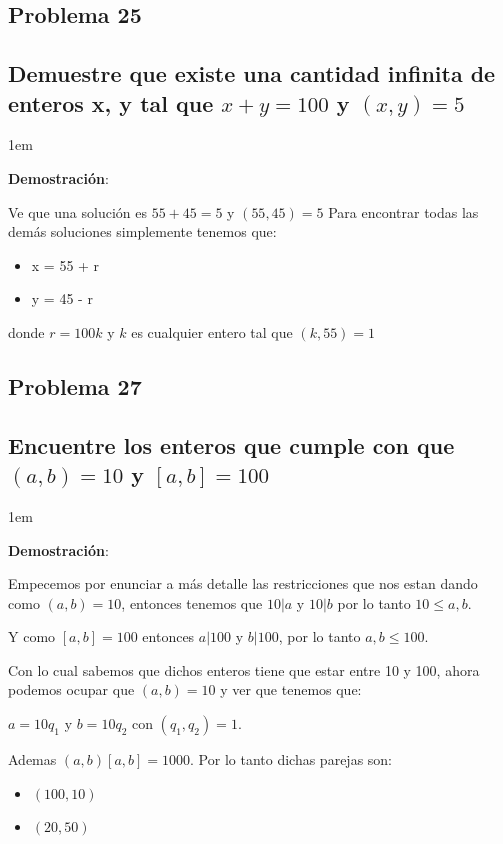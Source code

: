 \documentclass[12pt, fleqn]{article}                             %
\newenvironment{SmallIndentation}[1][0.75em]                    %
    {\begin{adjustwidth}{#1}{}\begin{footnotesize}}                 %
    {\end{footnotesize}\end{adjustwidth}}                           %
\begin{document}
    \subsection{Problema 25}
    \subsection*{Demuestre que existe una cantidad infinita de enteros
        x, y tal que $x+y=100$ y $(x,y)=5$}


        \begin{SmallIndentation}[1em]
            \textbf{Demostración}:

            Ve que una solución es $55 + 45 = 5$ y $(55, 45)=5$
            Para encontrar todas las demás soluciones simplemente 
            tenemos que:
            \begin{itemize}
                \item x = 55 + r
                \item y = 45 - r
            \end{itemize}

            donde $r = 100k$ y $k$ es cualquier entero tal que $(k, 55) = 1$
        \end{SmallIndentation}

    \clearpage

    \subsection{Problema 27}
    \subsection*{Encuentre los enteros que cumple con que $(a,b) = 10$ y $[a,b] = 100$}

        \begin{SmallIndentation}[1em]
            \textbf{Demostración}:

            Empecemos por enunciar a más detalle las restricciones que nos estan dando
            como $(a, b) = 10$, entonces tenemos que 
            $10|a$ y $10|b$ por lo tanto $10 \leq a, b$.

            Y como $[a, b] = 100$ entonces $a|100$ y $b|100$, por lo tanto $a, b \leq 100$.

            Con lo cual sabemos que dichos enteros tiene que estar entre 10 y 100, ahora
            podemos ocupar que $(a, b) = 10$ y ver que tenemos que:

            $a = 10q_1$ y $b = 10q_2$ con $(q_1, q_2) = 1$.

            Ademas $(a,b)[a,b] = 1000$. Por lo tanto dichas parejas son:

            \begin{itemize}
                \item $(100, 10)$
                \item $(20, 50)$
            \end{itemize}

        \end{SmallIndentation}
\end{document}

